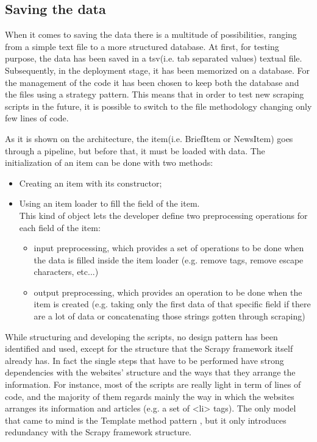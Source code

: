 \subsection{Saving the data}
When it comes to saving the data there is a multitude of possibilities, ranging from a simple text file to a more structured database. 
At first, for testing purpose, the data has been saved in a tsv(i.e. tab separated values) textual file. Subsequently, in the deployment stage, it has been memorized on a database. For the management of the code it has been chosen to keep both the database and the files using a strategy pattern. This means that in order to test new scraping scripts in the future, it is possible to switch to the file methodology changing only few lines of code. 
\par
As it is shown on the architecture, the item(i.e. BriefItem or NewsItem) goes through a pipeline, but before that, it must be loaded with data.
The initialization of an item can be done with two methods:
\begin{itemize}
	\item Creating an item with its constructor;
	\item Using an item loader to fill the field of the item.\\
	This kind of object lets the developer define two preprocessing operations for each field of the item:
	\begin{itemize}
		\item input preprocessing, which provides a set of operations to be done when the data is filled inside the item loader (e.g. remove tags, remove escape characters, etc...)
		\item output preprocessing, which provides an operation to be done when the item is created (e.g. taking only the first data of that specific field if there are a lot of data or concatenating those strings gotten through scraping)
	\end{itemize}
\end{itemize}

\par While structuring and developing the scripts, no design pattern has been identified and used, except for the structure that the Scrapy framework itself already has. In fact the single steps that have to be performed have strong dependencies with  the websites' structure and the ways that they arrange the information. For instance, most of the scripts are really light in term of lines of code, and the majority of them regards mainly the way in which the websites arranges its information and articles (e.g. a set of <li> tags). The only model that came to mind is the Template method pattern \cite{templatepattern}, but it only introduces redundancy with the Scrapy framework structure. 


